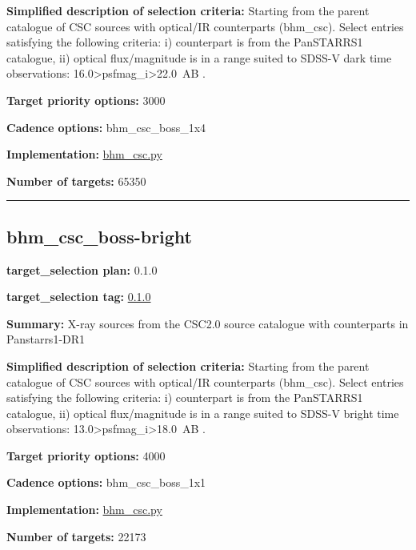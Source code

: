 \noindent\textbf{Simplified description of selection criteria:} Starting from the
parent catalogue of CSC sources with optical/IR counterparts (bhm\_csc).
Select entries satisfying the following criteria: i) counterpart is from
the PanSTARRS1 catalogue, ii) optical flux/magnitude is in a range
suited to SDSS-V dark time observations:
16.0\textgreater psfmag\_i\textgreater22.0~AB .


\noindent\textbf{Target priority options:} 3000

\noindent\textbf{Cadence options:} bhm\_csc\_boss\_1x4

\noindent\textbf{Implementation:}
\href{https://github.com/sdss/target_selection/blob/0.1.0/python/target_selection/cartons/bhm_csc.py}{bhm\_csc.py}

\noindent\textbf{Number of targets:} 65350

\begin{center}\rule{0.5\linewidth}{0.5pt}\end{center}

\hypertarget{bhm_csc_boss-bright_plan0.1.0}{%
\subsection{bhm\_csc\_boss-bright}\label{bhm_csc_boss-bright_plan0.1.0}}

\noindent\textbf{target\_selection plan:} 0.1.0

\noindent\textbf{target\_selection tag:}
\href{https://github.com/sdss/target_selection/tree/0.1.0/}{0.1.0}

\noindent\textbf{Summary:} X-ray sources from the CSC2.0 source catalogue with
counterparts in Panstarrs1-DR1

\noindent\textbf{Simplified description of selection criteria:} Starting from the
parent catalogue of CSC sources with optical/IR counterparts (bhm\_csc).
Select entries satisfying the following criteria: i) counterpart is from
the PanSTARRS1 catalogue, ii) optical flux/magnitude is in a range
suited to SDSS-V bright time observations:
13.0\textgreater psfmag\_i\textgreater18.0~AB .


\noindent\textbf{Target priority options:} 4000

\noindent\textbf{Cadence options:} bhm\_csc\_boss\_1x1

\noindent\textbf{Implementation:}
\href{https://github.com/sdss/target_selection/blob/0.1.0/python/target_selection/cartons/bhm_csc.py}{bhm\_csc.py}

\noindent\textbf{Number of targets:} 22173

